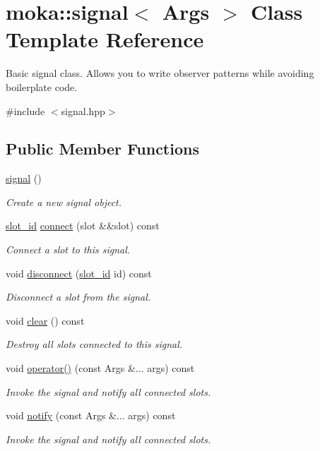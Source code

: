 \hypertarget{classmoka_1_1signal}{}\section{moka\+::signal$<$ Args $>$ Class Template Reference}
\label{classmoka_1_1signal}


Basic signal class. Allows you to write observer patterns while avoiding boilerplate code.  




{\ttfamily \#include $<$signal.\+hpp$>$}

\subsection*{Public Member Functions}
\begin{DoxyCompactItemize}
\item 
\mbox{\hyperlink{classmoka_1_1signal_ad71e1fffe02c33c1b62dd26c60f03577}{signal}} ()
\begin{DoxyCompactList}\small\item\em Create a new signal object. \end{DoxyCompactList}\item 
\mbox{\hyperlink{namespacemoka_a959d3112313fb589684e8b1e3df66385}{slot\+\_\+id}} \mbox{\hyperlink{classmoka_1_1signal_a63de4b64ffe3208549cc7497ec2852b6}{connect}} (slot \&\&slot) const
\begin{DoxyCompactList}\small\item\em Connect a slot to this signal. \end{DoxyCompactList}\item 
void \mbox{\hyperlink{classmoka_1_1signal_a69af1b997c17ea3cb311e1b7f3b24bf4}{disconnect}} (\mbox{\hyperlink{namespacemoka_a959d3112313fb589684e8b1e3df66385}{slot\+\_\+id}} id) const
\begin{DoxyCompactList}\small\item\em Disconnect a slot from the signal. \end{DoxyCompactList}\item 
void \mbox{\hyperlink{classmoka_1_1signal_a47b68d9f992a1b17feb7c230a32fdde4}{clear}} () const
\begin{DoxyCompactList}\small\item\em Destroy all slots connected to this signal. \end{DoxyCompactList}\item 
void \mbox{\hyperlink{classmoka_1_1signal_a3c01a7532eb7940725ae92413fe2fcc7}{operator()}} (const Args \&... args) const
\begin{DoxyCompactList}\small\item\em Invoke the signal and notify all connected slots. \end{DoxyCompactList}\item 
void \mbox{\hyperlink{classmoka_1_1signal_a908b81c71f100e074ead0def1f02a9c7}{notify}} (const Args \&... args) const
\begin{DoxyCompactList}\small\item\em Invoke the signal and notify all connected slots. \end{DoxyCompactList}\end{DoxyCompactItemize}
